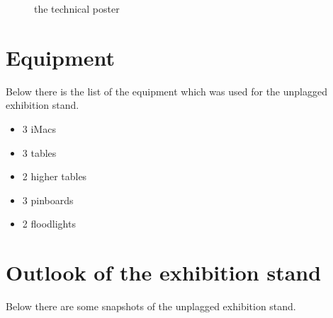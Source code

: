 \begin{figure}[!h]
  \centering
  \caption{the technical poster}
  \label{fig:poster_technical}
\end{figure}

\pagebreak 

\section{Equipment}
Below there is the list of the equipment which was used for the unplagged exhibition stand.

\begin{itemize}
\item 3 iMacs
\item 3 tables
\item 2 higher tables
\item 3 pinboards
\item 2 floodlights
\end{itemize}

\pagebreak 

\section{Outlook of the exhibition stand}
Below there are some snapshots of the unplagged exhibition stand.


